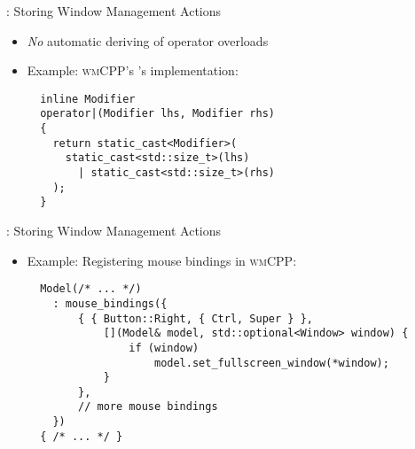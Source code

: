 \begin{frame}[fragile]{\underline{\cpp}: Storing Window Management Actions \hfill {\footnotesize \currentname}}


    \begin{itemize}

        \item \textit{No} automatic deriving of operator overloads

        \item Example: \textsc{wmCPP}'s 's  implementation:\\[3pt] 
\begin{verbatim}
  inline Modifier
  operator|(Modifier lhs, Modifier rhs)
  {
    return static_cast<Modifier>(
      static_cast<std::size_t>(lhs)
        | static_cast<std::size_t>(rhs)
    );
  }
\end{verbatim}

    \end{itemize}

    \vfill

\end{frame}

\begin{frame}[fragile]{\underline{\cpp}: Storing Window Management Actions \hfill {\footnotesize \currentname}}


    \begin{itemize}

        \item Example: Registering mouse bindings in \textsc{wmCPP}:\\[3pt] 
\begin{verbatim}
  Model(/* ... */)
    : mouse_bindings({
        { { Button::Right, { Ctrl, Super } },
            [](Model& model, std::optional<Window> window) {
                if (window)
                    model.set_fullscreen_window(*window);
            }
        },
        // more mouse bindings
    })
  { /* ... */ }
\end{verbatim}

    \end{itemize}

    \vfill

\end{frame}



